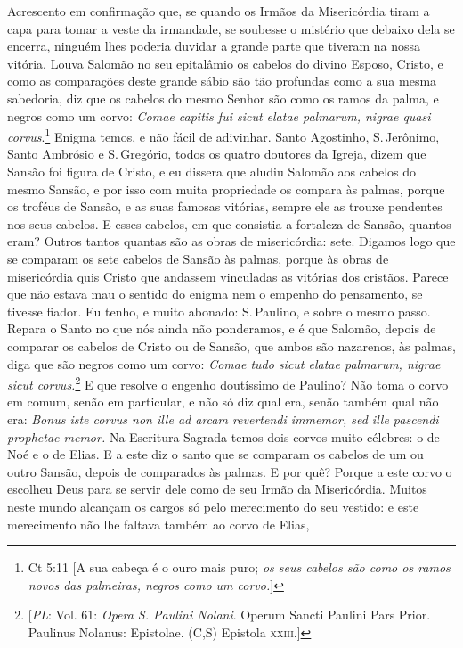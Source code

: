 Acrescento em confirmação que, se quando os Irmãos da Misericórdia tiram
a capa para tomar a veste da irmandade, se soubesse o mistério que
debaixo dela se encerra, ninguém lhes poderia duvidar a grande parte que
tiveram na nossa vitória. Louva Salomão no seu epitalâmio os cabelos do
divino Esposo, Cristo, e como as comparações deste grande sábio são tão
profundas como a sua mesma sabedoria, diz que os cabelos do mesmo Senhor
são como os ramos da palma, e negros como um corvo: \emph{Comae capitis
fui sicut elatae palmarum, nigrae quasi corvus}.\footnote{Ct 5:11 [A sua cabeça é o ouro mais puro; \textit{os seus cabelos são como os ramos novos das palmeiras, negros como um corvo.}]} Enigma
temos, e não fácil de adivinhar. Santo Agostinho, S.\,Jerônimo, Santo
Ambrósio e S.\,Gregório, todos os quatro doutores da Igreja, dizem que
Sansão foi figura de Cristo, e eu dissera que aludiu Salomão aos cabelos
do mesmo Sansão, e por isso com muita propriedade os compara às palmas,
porque os troféus de Sansão, e as suas famosas vitórias, sempre ele as
trouxe pendentes nos seus cabelos. E esses cabelos, em que consistia a
fortaleza de Sansão, quantos eram? Outros tantos quantas são as obras de
misericórdia: sete. Digamos logo que se comparam os sete cabelos de
Sansão às palmas, porque às obras de misericórdia quis Cristo que
andassem vinculadas as vitórias dos cristãos. Parece que não estava mau
o sentido do enigma nem o empenho do pensamento, se tivesse fiador. Eu
tenho, e muito abonado: S.\,Paulino, e sobre o mesmo passo. Repara o
Santo no que nós ainda não ponderamos, e é que Salomão, depois de
comparar os cabelos de Cristo ou de Sansão, que ambos são nazarenos,
às palmas, diga que são negros como um corvo: \emph{Comae tudo sicut
elatae palmarum, nigrae sicut corvus.}\footnote{[\textit{PL}: Vol. 61: \textit{Opera S. Paulini Nolani}. Operum Sancti Paulini Pars Prior. Paulinus Nolanus: Epistolae. (C,S) Epistola \textsc{xxiii}.]} E que resolve o engenho
doutíssimo de Paulino?
Não toma o corvo em comum, senão em particular, e não só diz qual era,
senão também qual não era: \emph{Bonus iste corvus non ille ad arcam
revertendi immemor, sed ille pascendi prophetae memor.} Na Escritura
Sagrada temos dois corvos muito célebres: o de Noé e o de Elias. E a
este diz o santo que se comparam os cabelos de um ou outro Sansão,
depois de comparados às palmas. E por quê? Porque a este corvo o
escolheu Deus para se servir dele como de seu Irmão da Misericórdia.
Muitos neste mundo alcançam os cargos só pelo merecimento do seu
vestido: e este merecimento não lhe faltava também ao corvo de Elias,
